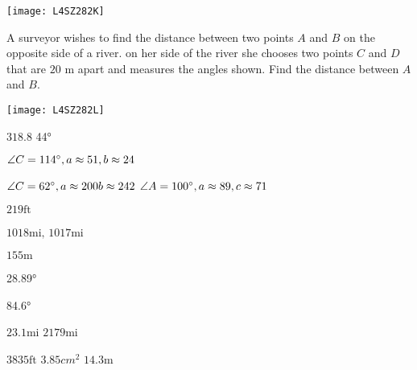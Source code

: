 \begin{Exercise}[title={Applications},label=exApplications]
\begin{multicols}{2}
	\texttt{[image: L4SZ282K]}	\\
\end{multicols}	

\begin{multicols}{2}
	\Question A surveyor wishes to find the distance between two points $A$ and $B$ on the opposite side of a river. on her side of the river she chooses two points $C$ and $D$ that are $20 \mbox{ m}$ apart and measures the angles shown. Find	the distance between $A$ and $B\text{.}$%
	\columnbreak 
	
	\texttt{[image: L4SZ282L]}	\\
\end{multicols}	
\end{Exercise}%
\begin{Answer}[ref={exApplications}]

	\Question %
\begin{tasks}
	\task 	$318.8$ 
	\task 	\ang{44}
\end{tasks}
\Question %
$\angle C =114 \mbox{{\ensuremath{{}^\circ}}} ,a \approx 51 ,b \approx 24$
\Question %
\begin{tasks}
	\task 	$\angle C =62 \mbox{{\ensuremath{{}^\circ}}} ,a \approx 200 b \approx 242$
	\task 	$\angle A =100 \mbox{{\ensuremath{{}^\circ}}} ,a \approx 89 ,c \approx 71$
\end{tasks}
	\Question%
	$219 \mbox{ft}$

\Question %
\begin{tasks}
	\task $1018 \mbox{mi}\text{,}$
	\task $1017 \mbox{mi}$
\end{tasks}

	\Question %
	$155 \mbox{m}$
	
\Question %
\begin{tasks}
	\task 	\ang{28.89}
\end{tasks}
\Question %
\begin{tasks}
	\task 	\ang{84.6}
\end{tasks}
\Question %
$23.1 \mbox{mi}$
\Question %
$2179 \mbox{mi}$

	\Question %
	$3835 \mbox{ft}$ 
	\Question %
	$3.85 cm^{2}$
	\Question %
	$14.3 \mbox{m}$
	
\end{Answer}%


